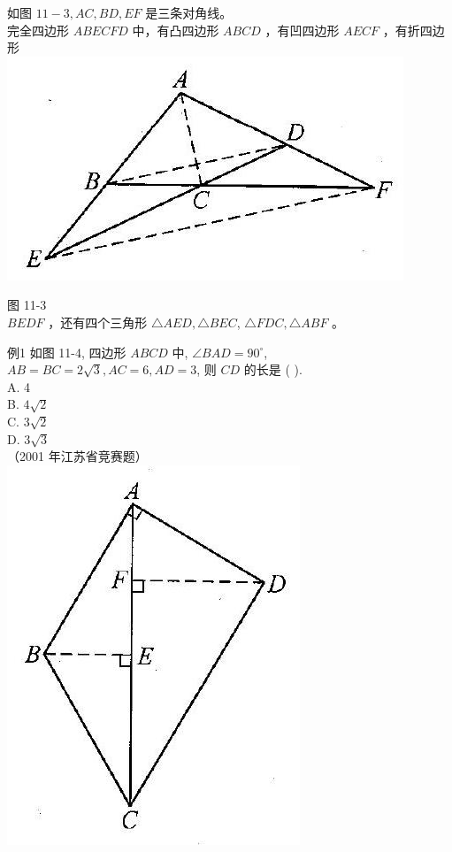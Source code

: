 \documentclass[10pt]{article}
\begin{document}
如图 $11-3, A C, B D, E F$ 是三条对角线。\\
完全四边形 $A B E C F D$ 中，有凸四边形 $A B C D$ ，有凹四边形 $A E C F$ ，有折四边形\\
\includegraphics[max width=\textwidth, center]{2024_10_30_2c8f45efd4a519b08e1ag-103(1)}

图 11-3\\
$B E D F$ ，还有四个三角形 $\triangle A E D, \triangle B E C$, $\triangle F D C, \triangle A B F$ 。

例1 如图 11-4, 四边形 $A B C D$ 中, $\angle B A D=90^{\circ}$, $A B=B C=2 \sqrt{3}, A C=6, A D=3$, 则 $C D$ 的长是 ( ).\\
A. 4\\
B. $4 \sqrt{2}$\\
C. $3 \sqrt{2}$\\
D. $3 \sqrt{3}$\\
（2001 年江苏省竞赛题）\\
\includegraphics[max width=\textwidth, center]{2024_10_30_2c8f45efd4a519b08e1ag-103}
\end{document}
